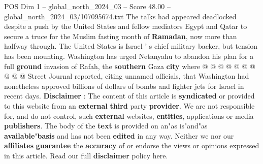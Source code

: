 \begin{textsample}{POS Dim 1 – global\_north\_2024\_03 – Score 48.00 – global\_north\_2024\_03/107095674.txt}
The talks had appeared deadlocked despite a push by the United States and fellow mediators Egypt and Qatar to secure a truce for the Muslim fasting month of \textbf{Ramadan}, now more than halfway through.
The United States is Israel ' s chief military backer, but tension has been mounting.
Washington has urged Netanyahu to abandon his plan for a full \textbf{ground} invasion of Rafah, the \textbf{southern} Gaza \textbf{city} where @ @ @ @ @ @ @ @ @ @ Street Journal reported, citing unnamed officials, that Washington had nonetheless approved billions of dollars of bombs and fighter jets for Israel in recent days. \textbf{Disclaimer} : The content of this article is \textbf{syndicated} or provided to this website from an \textbf{external} \textbf{third} party \textbf{provider}.
We are not responsible for, and do not control, such \textbf{external} websites, \textbf{entities}, applications or media \textbf{publishers}.
The body of the \textbf{text} is provided on an"as is"and"as \textbf{available}"\textbf{basis} and has not been \textbf{edited} in any way.
Neither we nor our \textbf{affiliates} \textbf{guarantee} the \textbf{accuracy} of or endorse the views or opinions expressed in this article.
Read our full \textbf{disclaimer} policy here.

\end{textsample}
